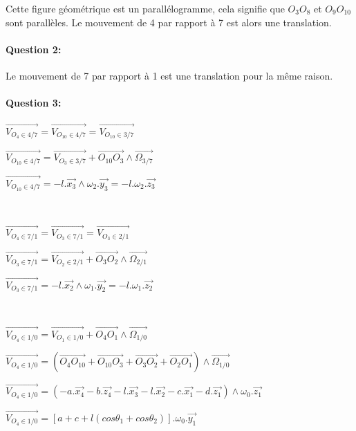 Cette figure géométrique est un parallélogramme, cela signifie que $O_3O_8$ et $O_9O_{10}$ sont parallèles. Le mouvement de 4 par rapport à 7 est alors une translation.

\paragraph{Question 2:} Le mouvement de 7 par rapport à 1 est une translation pour la même raison.

\paragraph{Question 3:} 

$\overrightarrow{V_{O_{4}\in 4/7}}=\overrightarrow{V_{O_{10}\in 4/7}}=\overrightarrow{V_{O_{10}\in 3/7}}$

$\overrightarrow{V_{O_{10}\in 4/7}}=\overrightarrow{V_{O_{3}\in 3/7}}+\overrightarrow{O_{10}O_{3}}\wedge \overrightarrow{\Omega_{3/7}}$

$\overrightarrow{V_{O_{10}\in 4/7}}=-l.\overrightarrow{x_3}\wedge \omega_2.\overrightarrow{y_3}=-l.\omega_2.\overrightarrow{z_3}$

~\

$\overrightarrow{V_{O_{4}\in 7/1}}=\overrightarrow{V_{O_{3}\in 7/1}}=\overrightarrow{V_{O_{3}\in 2/1}}$

$\overrightarrow{V_{O_{3}\in 7/1}}=\overrightarrow{V_{O_{2}\in 2/1}}+\overrightarrow{O_{3}O_{2}}\wedge \overrightarrow{\Omega_{2/1}}$

$\overrightarrow{V_{O_{3}\in 7/1}}=-l.\overrightarrow{x_2}\wedge \omega_1.\overrightarrow{y_2}=-l.\omega_1.\overrightarrow{z_2}$

~\

$\overrightarrow{V_{O_{4}\in 1/0}}=\overrightarrow{V_{O_{1}\in 1/0}}+\overrightarrow{O_{4}O_{1}}\wedge \overrightarrow{\Omega_{1/0}}$

$\overrightarrow{V_{O_{4}\in 1/0}}=(\overrightarrow{O_{4}O_{10}}+\overrightarrow{O_{10}O_{3}}+\overrightarrow{O_{3}O_{2}}+\overrightarrow{O_{2}O_{1}})\wedge \overrightarrow{\Omega_{1/0}}$

$\overrightarrow{V_{O_{4}\in 1/0}}=(-a.\overrightarrow{x_4}-b.\overrightarrow{z_4}-l.\overrightarrow{x_3}-l.\overrightarrow{x_2}-c.\overrightarrow{x_1}-d.\overrightarrow{z_1})\wedge \omega_{0}.\overrightarrow{z_1}$

$\overrightarrow{V_{O_{4}\in 1/0}}=\left[a+c+l(cos\theta_1+cos\theta_2)\right].\omega_{0}.\overrightarrow{y_1}$

